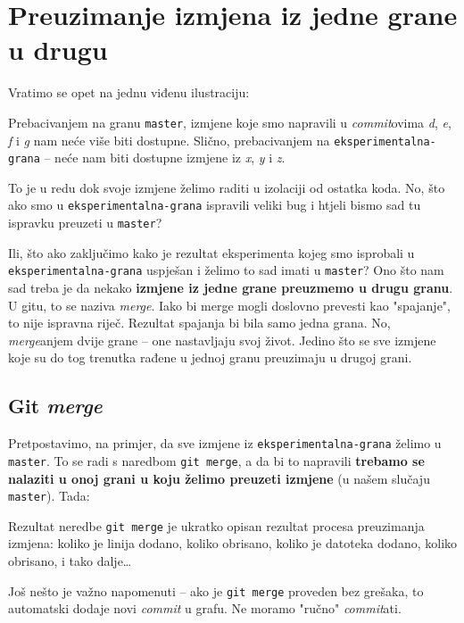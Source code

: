\chapter*{Preuzimanje izmjena iz jedne grane u drugu}

Vratimo se opet na jednu viđenu ilustraciju:



Prebacivanjem na granu \verb+master+, izmjene koje smo napravili u \emph{commit}ovima \emph d, \emph e, \emph f i \emph g nam neće više biti dostupne.
Slično, prebacivanjem na \verb+eksperimentalna-grana+ -- neće nam biti dostupne izmjene iz \emph x, \emph y i \emph z.

To je u redu dok svoje izmjene želimo raditi u izolaciji od ostatka koda. 
No, što ako smo u \verb+eksperimentalna-grana+ ispravili veliki bug i htjeli bismo sad tu ispravku preuzeti u \verb+master+?

Ili, što ako zaključimo kako je rezultat eksperimenta kojeg smo isprobali u \\
\verb+eksperimentalna-grana+ uspješan i želimo to sad imati u \verb+master+?
Ono što nam sad treba je da nekako \textbf{izmjene iz jedne grane preuzmemo u drugu granu}.
U gitu, to se naziva \emph{merge}.
Iako bi merge mogli doslovno prevesti kao "spajanje", to nije ispravna riječ. 
Rezultat spajanja bi bila samo jedna grana. 
No, \emph{merge}anjem dvije grane -- one nastavljaju svoj život. 
Jedino što se sve izmjene koje su do tog trenutka rađene u jednoj granu preuzimaju u drugoj grani.

\section*{Git \emph{merge}}

Pretpostavimo, na primjer, da sve izmjene iz \verb+eksperimentalna-grana+ želimo u \verb+master+. 
To se radi s naredbom \verb+git merge+, a da bi to napravili \textbf{trebamo se nalaziti u onoj grani u koju želimo preuzeti izmjene} (u našem slučaju \verb+master+).
Tada:



Rezultat neredbe \verb+git merge+ je ukratko opisan rezultat procesa preuzimanja izmjena: koliko je linija dodano, koliko obrisano, koliko je datoteka dodano, koliko obrisano, i tako dalje\dots

Još nešto je važno napomenuti -- ako je \verb+git merge+ proveden bez grešaka, to automatski dodaje novi \emph{commit} u grafu. 
Ne moramo "ručno" \emph{commit}ati.

